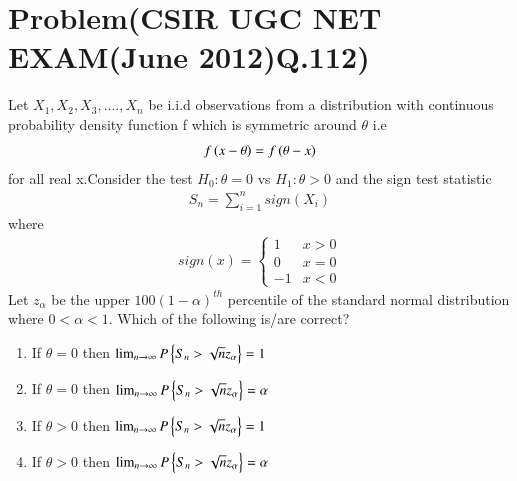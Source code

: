 \documentclass[journal,12pt,twocolumn]{IEEEtran}
\begin{document}
\section{Problem(CSIR UGC NET EXAM(June 2012)Q.112)}
Let $X_1,X_2,X_3,....,X_n$ be i.i.d observations from a distribution with continuous probability density function f which is symmetric around $\theta$ i.e
\begin{align}
    f\left(x-\theta\right)=f\left(\theta -x\right)
\end{align}
for all real x.Consider the test $H_0: \theta =0$ vs $H_1:  \theta >0$ and the sign test statistic
\begin{align}
    S_n = \sum_{i=1}^{n} sign(X_i)
\end{align}
where
\begin{align}
    sign(x) =
    \begin{cases}
    1  & x>0\\
    0  & x=0\\
    -1 & x<0
    \end{cases}
\end{align}
Let $z_\alpha$ be the upper $100(1-\alpha)^{th}$ percentile of the standard normal distribution where $0<\alpha <1$. Which of the following is/are correct?
\begin{enumerate}
    \item If $\theta =0$ then $ \lim_{n\to\infty} P\left\{S_n > \sqrt{n}z_{\alpha}\right\} =1 $\\
    \item If $\theta =0$ then $ \lim_{n\to\infty} P\left\{S_n > \sqrt{n}z_{\alpha}\right\} =\alpha $\\
    \item If $\theta >0$ then $ \lim_{n\to\infty} P\left\{S_n > \sqrt{n}z_{\alpha}\right\} = 1 $\\
    \item If $\theta >0$ then $ \lim_{n\to\infty} P\left\{S_n > \sqrt{n}z_{\alpha}\right\} =\alpha $
\end{enumerate}
\end{document}
